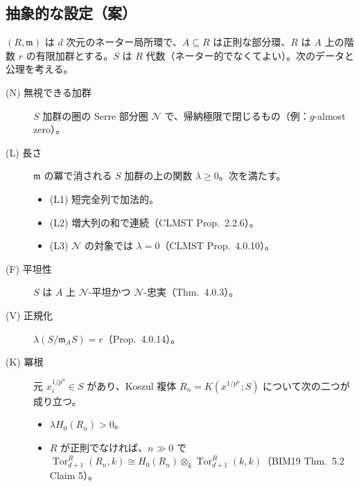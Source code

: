 \documentclass[11pt,a4paper]{ltjsarticle}
\theoremstyle{plain}
\theoremstyle{definition}
\theoremstyle{remark}
\theoremstyle{plain}
\newcommand{\m}{\mathfrak{m}}
\newcommand{\Tor}{\operatorname{Tor}}
\begin{document}
\subsection{抽象的な設定（案）}
$(R,\m)$ は $d$ 次元のネーター局所環で、$A\subseteq R$ は正則な部分環、$R$ は $A$ 上の階数 $r$ の有限加群とする。$S$ は $R$ 代数（ネーター的でなくてよい）。次のデータと公理を考える。
\begin{description}
  \item[(N) 無視できる加群] $S$ 加群の圏の Serre 部分圏 $\mathcal{N}$ で、帰納極限で閉じるもの（例：$g$-almost zero）。
  \item[(L) 長さ] $\m$ の冪で消される $S$ 加群の上の関数 $\lambda\ge0$。次を満たす。
  \begin{itemize}
    \item (L1) 短完全列で加法的。
    \item (L2) 増大列の和で連続（CLMST Prop.~2.2.6）。
    \item (L3) $\mathcal{N}$ の対象では $\lambda = 0$（CLMST Prop.~4.0.10）。
  \end{itemize}
  \item[(F) 平坦性] $S$ は $A$ 上 $\mathcal{N}$-平坦かつ $\mathcal{N}$-忠実（Thm.~4.0.3）。
  \item[(V) 正規化] $\lambda(S/\m_A S) = r$（Prop.~4.0.14）。
  \item[(K) 冪根] 元 $x_i^{1/p^n}\in S$ があり、Koszul 複体 $R_n = K(x^{1/p^n};S)$ について次の二つが成り立つ。
  \begin{itemize}
    \item $\lambda H_0(R_n) > 0$。
    \item $R$ が正則でなければ、$n\gg0$ で $\Tor^R_{d+1}(R_n,k)\cong H_0(R_n)\otimes_k\Tor^R_{d+1}(k,k)$（BIM19 Thm.~5.2 Claim 5）。
  \end{itemize}
\end{description}
\end{document}
